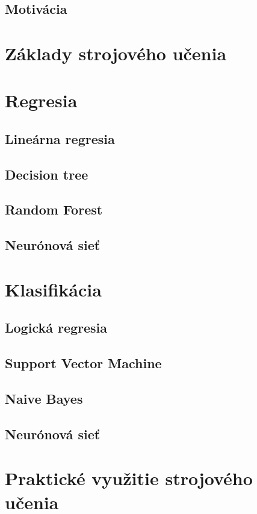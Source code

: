 \documentclass[8pt,twoside,slovak,a4paper]{article}
\begin{document}
\subsection{Motivácia} \label{motivacia}

\section{Základy strojového učenia} \label{základy}

\section{Regresia} \label{regresia}
\subsection{Lineárna regresia} \label{linearnareg}
\subsection{Decision tree}
\subsection{Random Forest}
\subsection{Neurónová sieť}

\section{Klasifikácia} \label{regresia}
\subsection{Logická regresia} \label{logickareg}
\subsection{Support Vector Machine}
\subsection{Naive Bayes}
\subsection{Neurónová sieť}

\section{Praktické využitie strojového učenia} \label{vyuzitie}
\end{document}
